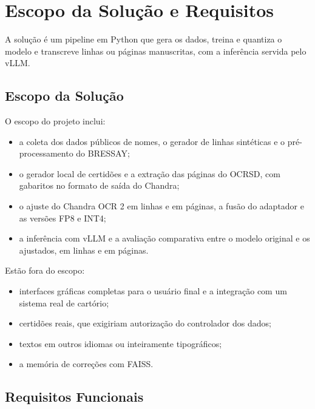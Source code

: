 \documentclass[12pt,a4paper]{article}
\begin{document}
\section{Escopo da Solução e Requisitos}
\label{sec:escopo}

A solução é um pipeline em Python que gera os dados, treina e quantiza o modelo e transcreve linhas ou páginas manuscritas, com a inferência servida pelo vLLM.

\subsection{Escopo da Solução}

O escopo do projeto inclui:
\begin{itemize}
    \item a coleta dos dados públicos de nomes, o gerador de linhas sintéticas e o pré-processamento do BRESSAY;
    \item o gerador local de certidões e a extração das páginas do OCRSD, com gabaritos no formato de saída do Chandra;
    \item o ajuste do Chandra OCR 2 em linhas e em páginas, a fusão do adaptador e as versões FP8 e INT4;
    \item a inferência com vLLM e a avaliação comparativa entre o modelo original e os ajustados, em linhas e em páginas.
\end{itemize}

Estão fora do escopo:
\begin{itemize}
    \item interfaces gráficas completas para o usuário final e a integração com um sistema real de cartório;
    \item certidões reais, que exigiriam autorização do controlador dos dados;
    \item textos em outros idiomas ou inteiramente tipográficos;
    \item a memória de correções com FAISS.
\end{itemize}

\subsection{Requisitos Funcionais}
\end{document}
